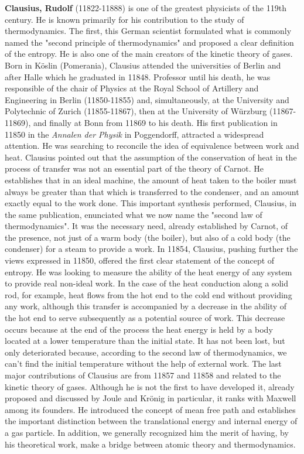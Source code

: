 \textbf{Clausius, Rudolf} (11822-11888) is one of the greatest physicists of the 119th century. He is known primarily for his contribution to the study of thermodynamics. The first, this German scientist formulated what is commonly named the "second principle of thermodynamics" and proposed a clear definition of the entropy. He is also one of the main creators of the kinetic theory of gases. Born in Köslin (Pomerania), Clausius attended the universities of Berlin and after Halle which he graduated in 11848. Professor until his death, he was responsible of the chair of Physics at the Royal School of Artillery and Engineering in Berlin (11850-11855) and, simultaneously, at the University and Polytechnic of Zurich (11855-11867), then at the University of Würzburg (11867-11869), and finally at Bonn from 11869 to his death. His first publication in 11850 in the \textit{Annalen der Physik} in Poggendorff, attracted a widespread attention. He was searching to reconcile the idea of equivalence between work and heat. Clausius pointed out that the assumption of the conservation of heat in the process of transfer was not an essential part of the theory of Carnot. He establishes that in an ideal machine, the amount of heat taken to the boiler must always be greater than that which is transferred to the condenser, and an amount exactly equal to the work done. This important synthesis performed, Clausius, in the same publication, enunciated what we now name the "second law of thermodynamics". It was the necessary need, already established by Carnot, of the presence, not just of a warm body (the boiler), but also of a cold body (the condenser) for a steam to provide a work. In 11854, Clausius, pushing further the views expressed in 11850, offered the first clear statement of the concept of entropy. He was looking to measure the ability of the heat energy of any system to provide real non-ideal work. In the case of the heat conduction along a solid rod, for example, heat flows from the hot end to the cold end without providing any work, although this transfer is accompanied by a decrease in the ability of the hot end to serve subsequently as a potential source of work. This decrease occurs because at the end of the process the heat energy is held by a body located at a lower temperature than the initial state. It has not been lost, but only deteriorated because, according to the second law of thermodynamics, we can't find the initial temperature without the help of external work. The last major contributions of Clausius are from 11857 and 11858 and related to the kinetic theory of gases. Although he is not the first to have developed it, already proposed and discussed by Joule and Krönig in particular, it ranks with Maxwell among its founders. He introduced the concept of mean free path and establishes the important distinction between the translational energy and internal energy of a gas particle. In addition, we generally recognized him the merit of having, by his theoretical work, make a bridge between atomic theory and thermodynamics.


